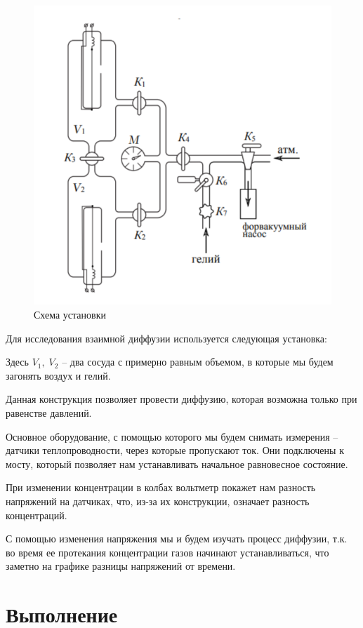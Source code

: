 \documentclass[a4paper,12pt]{article}
\theoremstyle{definition}
\begin{document}
\begin{figure}
	\includegraphics[scale=0.33]{facility}
	\caption{Схема установки}
	\label{facility}
\end{figure}

Для исследования взаимной диффузии используется следующая установка:

Здесь $V_1,\; V_2$ -- два сосуда с примерно равным объемом, в которые мы будем загонять воздух и гелий.

Данная конструкция позволяет провести диффузию, которая возможна только при равенстве давлений.

Основное оборудование, с помощью которого мы будем снимать измерения -- датчики теплопроводности, через которые пропускают ток. Они подключены к мосту, который позволяет нам устанавливать начальное равновесное состояние.

При изменении концентрации в колбах вольтметр покажет нам разность напряжений на датчиках, что, из-за их конструкции, означает разность концентраций.

С помощью изменения напряжения мы и будем изучать процесс диффузии, т.к. во время ее протекания концентрации газов начинают устанавливаться, что заметно на графике разницы напряжений от времени.

\section{Выполнение}
\end{document}
